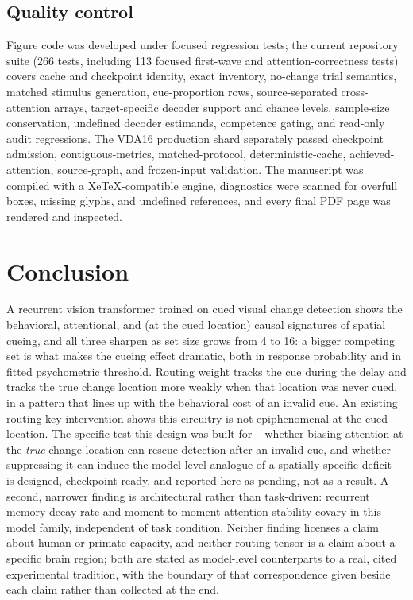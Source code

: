 \documentclass[11pt,a4paper]{article}
\begin{document}
\subsection{Quality control}
Figure code was developed under focused regression tests; the current repository suite (266 tests, including 113 focused first-wave and attention-correctness tests) covers cache and checkpoint identity, exact inventory, no-change trial semantics, matched stimulus generation, cue-proportion rows, source-separated cross-attention arrays, target-specific decoder support and chance levels, sample-size conservation, undefined decoder estimands, competence gating, and read-only audit regressions. The VDA16 production shard separately passed checkpoint admission, contiguous-metrics, matched-protocol, deterministic-cache, achieved-attention, source-graph, and frozen-input validation. The manuscript was compiled with a XeTeX-compatible engine, diagnostics were scanned for overfull boxes, missing glyphs, and undefined references, and every final PDF page was rendered and inspected.

\section{Conclusion}
A recurrent vision transformer trained on cued visual change detection shows the behavioral, attentional, and (at the cued location) causal signatures of spatial cueing, and all three sharpen as set size grows from 4 to 16: a bigger competing set is what makes the cueing effect dramatic, both in response probability and in fitted psychometric threshold. Routing weight tracks the cue during the delay and tracks the true change location more weakly when that location was never cued, in a pattern that lines up with the behavioral cost of an invalid cue. An existing routing-key intervention shows this circuitry is not epiphenomenal at the cued location. The specific test this design was built for -- whether biasing attention at the \emph{true} change location can rescue detection after an invalid cue, and whether suppressing it can induce the model-level analogue of a spatially specific deficit -- is designed, checkpoint-ready, and reported here as pending, not as a result. A second, narrower finding is architectural rather than task-driven: recurrent memory decay rate and moment-to-moment attention stability covary in this model family, independent of task condition. Neither finding licenses a claim about human or primate capacity, and neither routing tensor is a claim about a specific brain region; both are stated as model-level counterparts to a real, cited experimental tradition, with the boundary of that correspondence given beside each claim rather than collected at the end.
\end{document}
